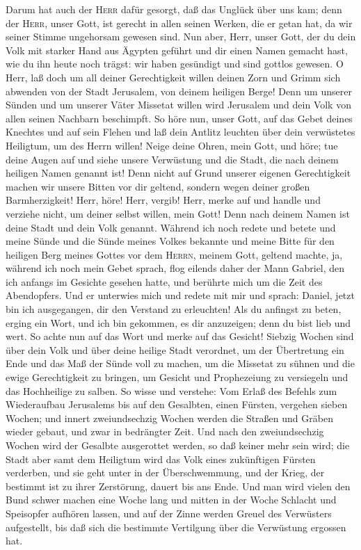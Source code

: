 Darum hat auch der \textsc{Herr} dafür gesorgt, daß das Unglück über uns
kam; denn der \textsc{Herr}, unser Gott, ist gerecht in allen seinen
Werken, die er getan hat, da wir seiner Stimme ungehorsam gewesen sind.
 Nun aber, Herr, unser Gott, der du dein Volk mit starker
Hand aus Ägypten geführt und dir einen Namen gemacht hast, wie du ihn
heute noch trägst: wir haben gesündigt und sind gottlos gewesen.
 O Herr, laß doch um all deiner Gerechtigkeit willen
deinen Zorn und Grimm sich abwenden von der Stadt Jerusalem, von deinem
heiligen Berge! Denn um unserer Sünden und um unserer Väter Missetat
willen wird Jerusalem und dein Volk von allen seinen Nachbarn
beschimpft.  So höre nun, unser Gott, auf das Gebet
deines Knechtes und auf sein Flehen und laß dein Antlitz leuchten über
dein verwüstetes Heiligtum, um des Herrn willen!  Neige
deine Ohren, mein Gott, und höre; tue deine Augen auf und siehe unsere
Verwüstung und die Stadt, die nach deinem heiligen Namen genannt ist!
Denn nicht auf Grund unserer eigenen Gerechtigkeit machen wir unsere
Bitten vor dir geltend, sondern wegen deiner großen Barmherzigkeit!
 Herr, höre! Herr, vergib! Herr, merke auf und handle und
verziehe nicht, um deiner selbst willen, mein Gott! Denn nach deinem
Namen ist deine Stadt und dein Volk genannt.  Während ich
noch redete und betete und meine Sünde und die Sünde meines Volkes
bekannte und meine Bitte für den heiligen Berg meines Gottes vor dem
\textsc{Herrn}, meinem Gott, geltend machte,  ja, während
ich noch mein Gebet sprach, flog eilends daher der Mann Gabriel, den ich
anfangs im Gesichte gesehen hatte, und berührte mich um die Zeit des
Abendopfers.  Und er unterwies mich und redete mit mir
und sprach: Daniel, jetzt bin ich ausgegangen, dir den Verstand zu
erleuchten!  Als du anfingst zu beten, erging ein Wort,
und ich bin gekommen, es dir anzuzeigen; denn du bist lieb und wert. So
achte nun auf das Wort und merke auf das Gesicht! 
Siebzig Wochen sind über dein Volk und über deine heilige Stadt
verordnet, um der Übertretung ein Ende und das Maß der Sünde voll zu
machen, um die Missetat zu sühnen und die ewige Gerechtigkeit zu
bringen, um Gesicht und Prophezeiung zu versiegeln und das Hochheilige
zu salben.  So wisse und verstehe: Vom Erlaß des Befehls
zum Wiederaufbau Jerusalems bis auf den Gesalbten, einen Fürsten,
vergehen sieben Wochen; und innert zweiundsechzig Wochen werden die
Straßen und Gräben wieder gebaut, und zwar in bedrängter Zeit.
 Und nach den zweiundsechzig Wochen wird der Gesalbte
ausgerottet werden, so daß keiner mehr sein wird; die Stadt aber samt
dem Heiligtum wird das Volk eines zukünftigen Fürsten verderben, und sie
geht unter in der Überschwemmung, und der Krieg, der bestimmt ist zu
ihrer Zerstörung, dauert bis ans Ende.  Und man wird
vielen den Bund schwer machen eine Woche lang und mitten in der Woche
Schlacht und Speisopfer aufhören lassen, und auf der Zinne werden Greuel
des Verwüsters aufgestellt, bis daß sich die bestimmte Vertilgung über
die Verwüstung ergossen hat.

